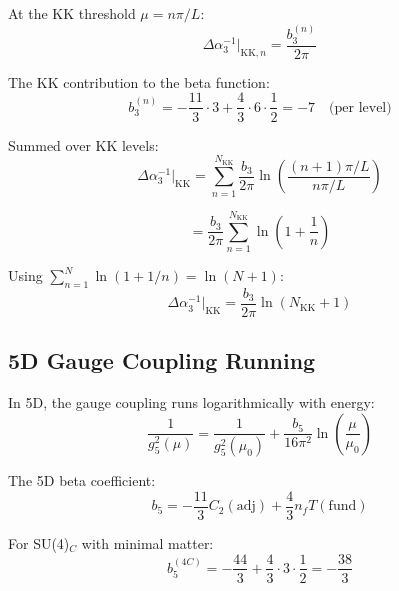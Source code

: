 \documentclass[11pt,a4paper]{article}
\theoremstyle{definition}
\begin{document}
At the KK threshold $\mu = n\pi/L$:
\begin{equation}
  \label{eq:threshold-kk-1}
  \Delta\alpha_3^{-1}|_{\text{KK},n} = \frac{b_3^{(n)}}{2\pi}
\end{equation}

The KK contribution to the beta function:
\begin{equation}
  \label{eq:beta-kk}
  b_3^{(n)} = -\frac{11}{3} \cdot 3 + \frac{4}{3} \cdot 6 \cdot \frac{1}{2} = -7 \quad \text{(per level)}
\end{equation}

Summed over KK levels:
\begin{equation}
  \label{eq:threshold-sum}
  \Delta\alpha_3^{-1}|_{\text{KK}} = \sum_{n=1}^{N_{\text{KK}}} \frac{b_3}{2\pi} \ln\left(\frac{(n+1)\pi/L}{n\pi/L}\right)
\end{equation}

\begin{equation}
  \label{eq:threshold-sum-2}
  = \frac{b_3}{2\pi} \sum_{n=1}^{N_{\text{KK}}} \ln\left(1 + \frac{1}{n}\right)
\end{equation}

Using $\sum_{n=1}^{N} \ln(1 + 1/n) = \ln(N+1)$:
\begin{equation}
  \label{eq:threshold-sum-3}
  \Delta\alpha_3^{-1}|_{\text{KK}} = \frac{b_3}{2\pi} \ln(N_{\text{KK}} + 1)
\end{equation}

\subsection{5D Gauge Coupling Running}
\label{subsec:5d-running}

In 5D, the gauge coupling runs logarithmically with energy:
\begin{equation}
  \label{eq:5d-run-1}
  \frac{1}{g_5^2(\mu)} = \frac{1}{g_5^2(\mu_0)} + \frac{b_5}{16\pi^2} \ln\left(\frac{\mu}{\mu_0}\right)
\end{equation}

The 5D beta coefficient:
\begin{equation}
  \label{eq:beta-5d}
  b_5 = -\frac{11}{3} C_2(\text{adj}) + \frac{4}{3} n_f T(\text{fund})
\end{equation}

For SU(4)$_C$ with minimal matter:
\begin{equation}
  \label{eq:beta-5d-su4}
  b_5^{(4C)} = -\frac{44}{3} + \frac{4}{3} \cdot 3 \cdot \frac{1}{2} = -\frac{38}{3}
\end{equation}
\end{document}
